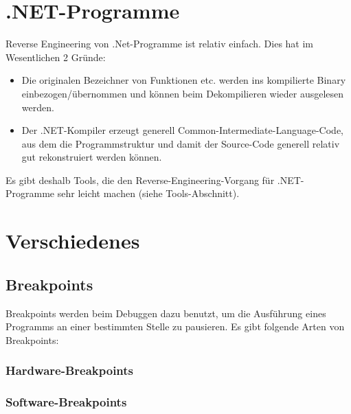 \begin{multicols}{3}
\section{.NET-Programme}
Reverse Engineering von .Net-Programme ist relativ einfach. Dies hat im Wesentlichen 2 Gründe:
\begin{itemize}
\item Die originalen Bezeichner von Funktionen etc. werden ins kompilierte Binary einbezogen/übernommen und können beim Dekompilieren wieder ausgelesen werden.
\item Der .NET-Kompiler erzeugt generell Common-Intermediate-Language-Code, aus dem die Programmstruktur und damit der Source-Code generell relativ gut rekonstruiert werden können.
\end{itemize}
Es gibt deshalb Tools, die den Reverse-Engineering-Vorgang für .NET-Programme sehr leicht machen (siehe Tools-Abschnitt).
\section{Verschiedenes}
\subsection{Breakpoints}
Breakpoints werden beim Debuggen dazu benutzt, um die Ausführung eines Programms an einer bestimmten Stelle zu pausieren. Es gibt folgende Arten von Breakpoints:
\subsubsection{Hardware-Breakpoints}
\subsubsection{Software-Breakpoints}
\end{multicols}
